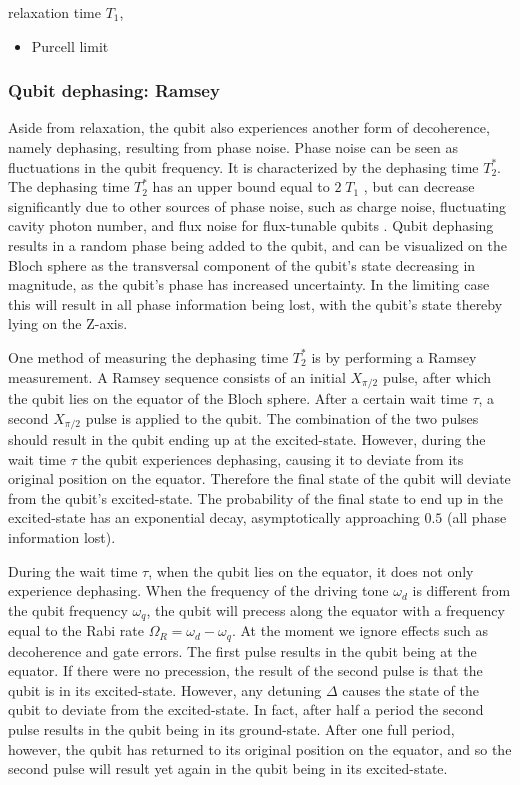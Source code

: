           relaxation time $T_1$,

          \begin{itemize}
            \item Purcell limit
          \end{itemize}


        \subsubsection{Qubit dephasing: Ramsey}
          \label{sssec:Ramsey}
          Aside from relaxation, the qubit also experiences another form of decoherence, namely dephasing, resulting from phase noise. Phase noise can be seen as fluctuations in the qubit frequency. It is characterized by the dephasing time $T_2^*$. The dephasing time $T_2^*$ has an upper bound equal to $2\;T_1$ \cite[pp56-58]{Bishop}, but can decrease significantly due to other sources of phase noise, such as charge noise, fluctuating cavity photon number, and flux noise for flux-tunable qubits \cite[p126]{Sears}. Qubit dephasing results in a random phase being added to the qubit, and can be visualized on the Bloch sphere as the transversal component of the qubit's state decreasing in magnitude, as the qubit's phase has increased uncertainty. In the limiting case this will result in all phase information being lost, with the qubit's state thereby lying on the Z-axis.

          One method of measuring the dephasing time $T_2^*$ is by performing a Ramsey measurement. A Ramsey sequence consists of an initial $X_{\pi/2}$ pulse, after which the qubit lies on the equator of the Bloch sphere. After a certain wait time $\tau$, a second $X_{\pi/2}$ pulse is applied to the qubit. The combination of the two pulses should result in the qubit ending up at the excited-state. However, during the wait time $\tau$ the qubit experiences dephasing, causing it to deviate from its original position on the equator. Therefore the final state of the qubit will deviate from the qubit's excited-state. The probability of the final state to end up in the excited-state has an exponential decay, asymptotically approaching $0.5$ (all phase information lost).

          During the wait time $\tau$, when the qubit lies on the equator, it does not only experience dephasing. When the frequency of the driving tone $\omega_d$ is different from the qubit frequency $\omega_q$, the qubit will precess along the equator with a frequency equal to the Rabi rate $\Omega_R = \omega_d - \omega_q$. At the moment we ignore effects such as decoherence and gate errors. The first pulse results in the qubit being at the equator. If there were no precession, the result of the second pulse is that the qubit is in its excited-state. However, any detuning $\Delta$ causes the state of the qubit to deviate from the excited-state. In fact, after half a period the second pulse results in the qubit being in its ground-state. After one full period, however, the qubit has returned to its original position on the equator, and so the second pulse will result yet again in the qubit being in its excited-state.

